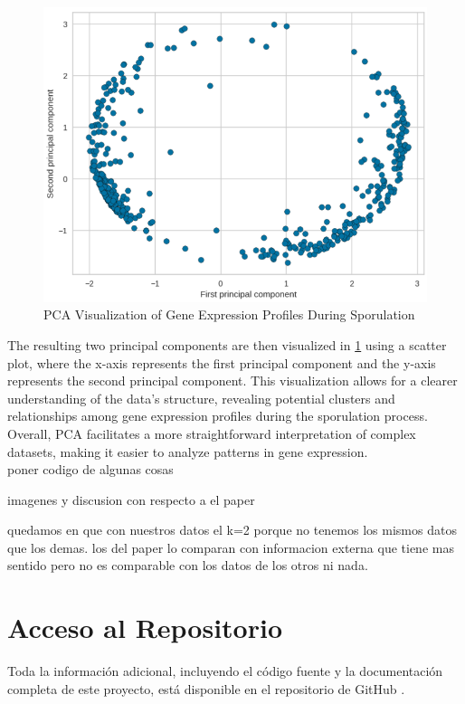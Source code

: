 \documentclass{article}
\begin{document}
\begin{figure}[H]
	\centering
	\includegraphics[width=\textwidth]{images/pca.png}
	\caption{PCA Visualization of Gene Expression Profiles During Sporulation}
	\label{fig:pca}
\end{figure}


The resulting two principal components are then visualized in \ref{fig:pca} using a scatter plot, where the x-axis represents the first principal component and the y-axis represents the second principal component. This visualization allows for a clearer understanding of the data's structure, revealing potential clusters and relationships among gene expression profiles during the sporulation process. Overall, PCA facilitates a more straightforward interpretation of complex datasets, making it easier to analyze patterns in gene expression.
\\


poner codigo de algunas cosas


imagenes y discusion con respecto a el paper

quedamos en que con nuestros datos el k=2 porque no tenemos los mismos datos que los demas. los del paper lo comparan con informacion externa que tiene mas sentido pero no es comparable con los datos de los otros ni nada.

\newpage
\section{Acceso al Repositorio}


Toda la información adicional, incluyendo el código fuente y la documentación completa de este proyecto, está disponible en el repositorio de GitHub \cite{silva2024github}.

\end{document}
